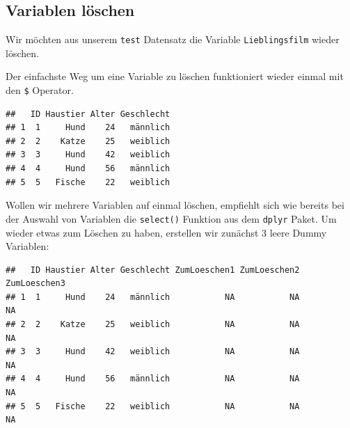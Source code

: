 \documentclass[
]{book}
\newenvironment{Shaded}{\begin{snugshade}}{\end{snugshade}}
\newcommand{\ConstantTok}[1]{\textcolor[rgb]{0.56,0.35,0.01}{#1}}
\newcommand{\NormalTok}[1]{#1}
\newcommand{\OtherTok}[1]{\textcolor[rgb]{0.56,0.35,0.01}{#1}}
\newcommand{\SpecialCharTok}[1]{\textcolor[rgb]{0.81,0.36,0.00}{\textbf{#1}}}
\begin{document}
\subsection{Variablen löschen}\label{variablen-luxf6schen}

Wir möchten aus unserem \texttt{test} Datensatz die Variable \texttt{Lieblingsfilm} wieder löschen.

Der einfachste Weg um eine Variable zu löschen funktioniert wieder einmal mit den \texttt{\$} Operator.

\begin{Shaded}
\end{Shaded}

\begin{verbatim}
##   ID Haustier Alter Geschlecht
## 1  1     Hund    24   männlich
## 2  2    Katze    25   weiblich
## 3  3     Hund    42   weiblich
## 4  4     Hund    56   männlich
## 5  5   Fische    22   weiblich
\end{verbatim}

Wollen wir mehrere Variablen auf einmal löschen, empfiehlt sich wie bereits bei der Auswahl von Variablen die \texttt{select()} Funktion aus dem \texttt{dplyr} Paket. Um wieder etwas zum Löschen zu haben, erstellen wir zunächst 3 leere Dummy Variablen:

\begin{Shaded}
\end{Shaded}

\begin{verbatim}
##   ID Haustier Alter Geschlecht ZumLoeschen1 ZumLoeschen2 ZumLoeschen3
## 1  1     Hund    24   männlich           NA           NA           NA
## 2  2    Katze    25   weiblich           NA           NA           NA
## 3  3     Hund    42   weiblich           NA           NA           NA
## 4  4     Hund    56   männlich           NA           NA           NA
## 5  5   Fische    22   weiblich           NA           NA           NA
\end{verbatim}
\end{document}
